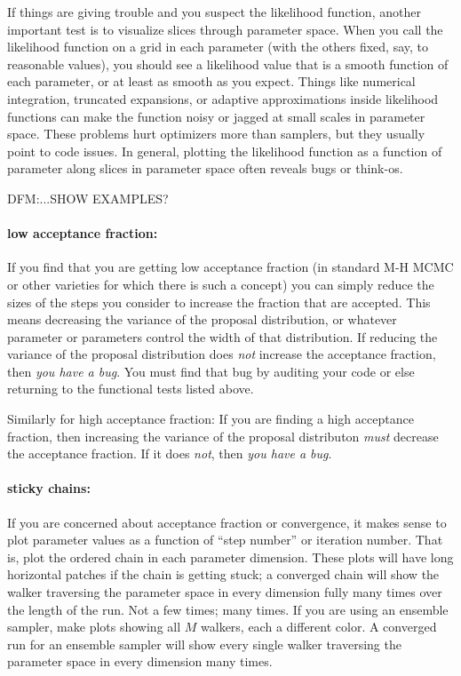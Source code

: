 \documentclass[12pt,twoside,pdftex]{article}
\begin{document}
If things are giving trouble and you suspect the likelihood function,
  another important test is to visualize slices through parameter space.
When you call the likelihood function on a grid in each parameter
  (with the others fixed, say, to reasonable values),
  you should see a likelihood value that is a smooth function of each parameter,
  or at least as smooth as you expect.
Things like numerical integration,
  truncated expansions,
  or adaptive approximations
  inside likelihood functions
  can make the function noisy or jagged at small scales in parameter space.
These problems hurt optimizers more than samplers,
  but they usually point to code issues.
In general, plotting the likelihood function as a function of parameter along
  slices in parameter space often reveals bugs or think-os.

DFM:...SHOW EXAMPLES?

\paragraph{low acceptance fraction:}
If you find that you are getting low acceptance fraction
  (in standard M-H MCMC or other varieties for which there is such a concept)
  you can simply reduce the sizes of the steps you consider to increase the fraction that are accepted.
This means decreasing the variance of the proposal distribution,
  or whatever parameter or parameters control the width of that distribution.
If reducing the variance of the proposal distribution does \emph{not} increase the acceptance fraction,
  then \emph{you have a bug}.
You must find that bug by auditing your code or else returning to the functional tests listed above.

Similarly for high acceptance fraction:
If you are finding a high acceptance fraction,
  then increasing the variance of the proposal distributon \emph{must} decrease the acceptance fraction.
If it does \emph{not}, then \emph{you have a bug}.

\paragraph{sticky chains:}
If you are concerned about acceptance fraction or convergence,
  it makes sense to plot parameter values as a function of ``step number'' or iteration number.
That is, plot the ordered chain in each parameter dimension.
These plots will have long horizontal patches if the chain is getting stuck;
  a converged chain will show the walker traversing the parameter space in every dimension fully many times
  over the length of the run.
Not a few times; many times.
If you are using an ensemble sampler,
  make plots showing all $M$ walkers, each a different color.
A converged run for an ensemble sampler will show every single walker traversing the parameter space
  in every dimension many times.
\end{document}
